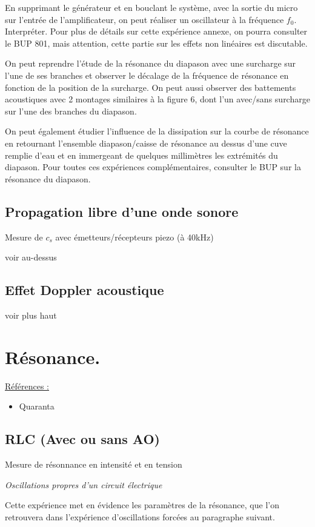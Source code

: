 \documentclass{article}%
\begin{document}
En supprimant le générateur et en bouclant le système, avec la sortie du micro sur l'entrée de l'amplificateur, on peut réaliser un oscillateur à la fréquence $f_0$. Interpréter. Pour plus de détails sur cette expérience annexe, on pourra consulter le BUP 801, mais attention, cette partie sur les effets non linéaires est discutable.

On peut reprendre l'étude de la résonance du diapason avec une surcharge sur l'une de ses branches et observer le décalage de la fréquence de résonance en fonction de la position de la surcharge. On peut aussi observer des battements acoustiques avec 2 montages similaires à la figure 6, dont l'un avec/sans surcharge sur l'une des branches du diapason.

On peut également étudier l'influence de la dissipation sur la courbe de résonance en retournant l'ensemble diapason/caisse de résonance au dessus d'une cuve remplie d'eau et en immergeant de quelques millimètres les extrémités du diapason. Pour toutes ces expériences complémentaires, consulter le BUP sur la résonance du diapason.


\subsection{Propagation libre d'une onde sonore}
Mesure de $c_s$ avec émetteurs/récepteurs piezo (à 40kHz)

voir au-dessus

\subsection{Effet Doppler acoustique}

voir plus haut

\section{Résonance.}
\underline{Références :}
\begin{itemize}
	\item Quaranta
\end{itemize}
\subsection{RLC (Avec ou sans AO)}
Mesure de résonnance en intensité et en tension

\textit{Oscillations propres d'un circuit électrique}

Cette expérience met en évidence les paramètres de la résonance, que l'on retrouvera dans l'expérience d'oscillations forcées au paragraphe suivant.
\end{document}
